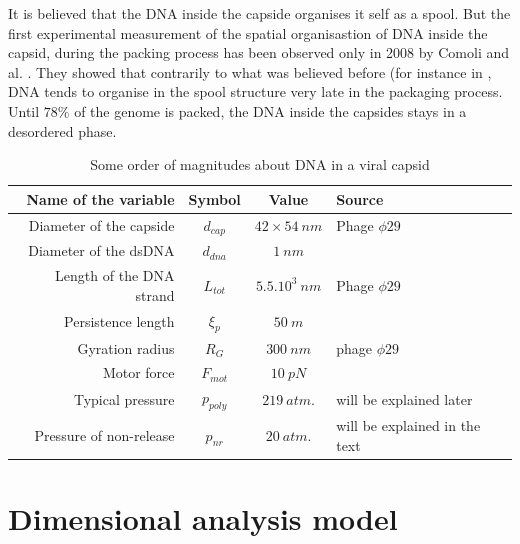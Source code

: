 \documentclass{article}
\begin{document}
It is believed that the DNA inside the capside organises it self as a spool. But the first experimental measurement of the spatial organisastion of DNA inside the capsid, during the packing process has been observed only in 2008 by Comoli and al. \cite{comoli2008}. They showed that contrarily to what was believed before (for instance in \cite{phillips2005, prohit2005}, DNA tends to organise in the spool structure very late in the packaging process. Until $78\%$ of the genome is packed, the DNA inside the capsides stays in a desordered phase.

\begin{table}[h]
    \centering
    \begin{tabular}{|| r | c | c | l ||}
        \hline \hline
        \textbf{Name of the variable} & \textbf{Symbol} & \textbf{Value} & \textbf{Source} \\
        \hline \hline
        Diameter of the capside  & $d_{cap}$   & $42\times 54~nm$ & Phage $\phi29$ \cite{tao1998}  \\
        Diameter of the dsDNA    & $ d_{dna}$  & $1~nm$           & \cite{phillips2005} \\
        Length of the DNA strand & $ L_{tot}$  & $5.5.10^{3}~nm$  & Phage $\phi29$ \cite{tao1998} \\
        Persistence length       & $ \xi_p $   & $50~m$           & \cite{smith2001} \\
        Gyration radius          & $ R_{G} $     & $300~nm$         & phage $\phi29$ \cite{phillips2005} \\
        Motor force              & $ F_{mot}$  & $10~pN$          & \cite{phillips2005} \\
        Typical pressure         & $ p_{poly}$ & $219~atm.$       & will be explained later \\
        Pressure of non-release  & $ p_{nr} $  & $20~atm.$        & will be explained in the text \\
        \hline \hline
    \end{tabular}
    \caption{Some order of magnitudes about DNA in a viral capsid}
    \label{tab:figures}
\end{table}

\section{Dimensional analysis model}
\end{document}
